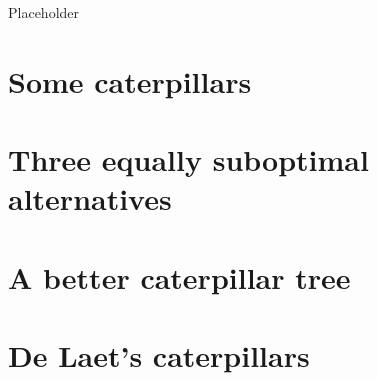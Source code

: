 \documentclass[]{book}
\theoremstyle{definition}
\theoremstyle{definition}
\theoremstyle{definition}
\theoremstyle{remark}
\begin{document}
Placeholder

\hypertarget{some-caterpillars}{%
\section{Some caterpillars}\label{some-caterpillars}}

\hypertarget{three-equally-suboptimal-alternatives}{%
\section{Three equally suboptimal
alternatives}\label{three-equally-suboptimal-alternatives}}

\hypertarget{a-better-caterpillar-tree}{%
\section{A better caterpillar tree}\label{a-better-caterpillar-tree}}

\hypertarget{de-laets-caterpillars}{%
\section{De Laet's caterpillars}\label{de-laets-caterpillars}}


\end{document}
